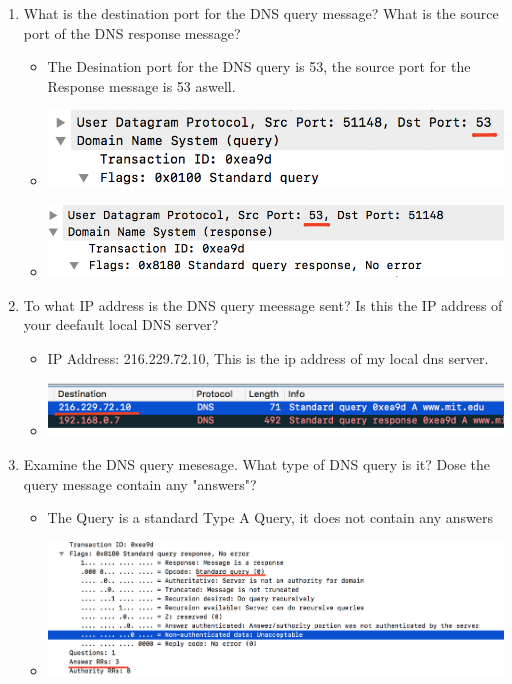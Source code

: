 \documentclass{article}
\begin{document}
\begin{itemize}
\begin{enumerate}
    \item What is the destination port for the DNS query message? What is the source port of the DNS response message?
    \begin{itemize}
      \item The Desination port for the DNS query is 53, the source port for the Response message is 53 aswell.
      \item \includegraphics[scale=0.5]{images/DNS11a.png}
      \item \includegraphics[scale=0.5]{images/DNS11b.png}
    \end{itemize}

    \item To what IP address is the DNS query meessage sent?  Is this the IP address of your deefault local DNS server?
    \begin{itemize}
      \item IP Address: 216.229.72.10, This is the ip address of my local dns server.\par
      \item \includegraphics[scale=0.5]{images/DNS12.png}
    \end{itemize}

    \item Examine the DNS query mesesage.  What type of DNS query is it?  Dose the query message contain any "answers"?
    \begin{itemize}
      \item The Query is a standard Type A Query, it does not contain any answers
      \item \includegraphics[scale=0.5]{images/DNS13.png}
    \end{itemize}


\end{enumerate}
\end{itemize}
\end{document}
